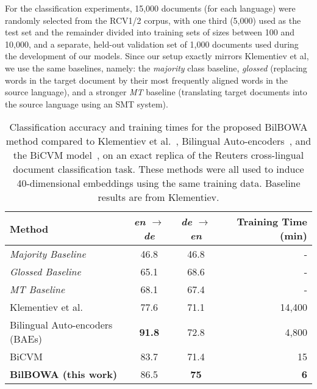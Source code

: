 \documentclass[10pt]{article}
\newcommand\bld[1]{\textbf{#1}}
\begin{document}
For the classification experiments, 15,000 documents (for each language) were
randomly selected from the RCV1/2 corpus, with one third (5,000) used as the
test set and the remainder divided into training sets of
sizes between 100 and 10,000, and a separate, held-out validation set
of 1,000 documents used during the development of our models.
Since our setup exactly mirrors Klementiev et al, we use the same baselines,
namely: the \emph{majority} class baseline, \emph{glossed} (replacing words in
the target document by their most frequently aligned words in the source
language), and a stronger \emph{MT} baseline (translating target documents into
the source language using an SMT system).

\begin{table*}
  \small
    \centering
    \begin{tabular}{l|cc|r}
      \hline
      \bld{Method}  & \emph{en} $\rightarrow$ \emph{de} & \emph{de} $\rightarrow$ \emph{en}  & \bld{Training Time (min)} \\
      \hline
      \emph{Majority Baseline} & 46.8 & 46.8 & - \\
      \emph{Glossed Baseline} & 65.1 & 68.6 & - \\
      \emph{MT Baseline} & 68.1 & 67.4 & - \\
      \hline
      Klementiev et al.\              & 77.6       & 71.1     & 14,400 \\
      Bilingual Auto-encoders (BAEs)  & \bld{91.8} & 72.8     & 4,800  \\
      BiCVM                           & 83.7       & 71.4     & 15     \\
      \bld{BilBOWA (this work)}             & 86.5       & \bld{75} & \bld{6}          \\
      \hline
    \end{tabular}
    \caption{Classification accuracy and training times for the proposed BilBOWA method compared
    to Klementiev et al.~\cite{klementiev2012}, Bilingual Auto-encoders~\cite{chandar2014autoencoder},
    and the BiCVM model~\cite{hermann2013multilingual}, on an exact replica of the
    Reuters cross-lingual document classification task. These methods were all used
    to induce 40-dimensional embeddings using the same training data. Baseline results 
    are from Klementiev.}
    \label{tab:cldc-results}
\end{table*}
\end{document}

